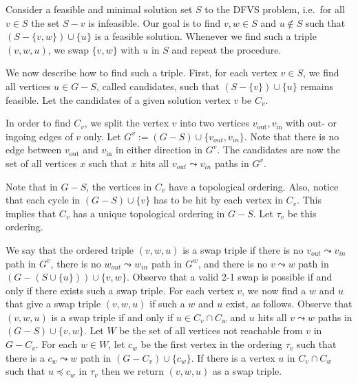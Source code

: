 Consider a feasible and minimal solution set $S$ to the DFVS problem, i.e.~for all $v \in S$ the set $S - v$ is infeasible. 
Our goal is to find $v,w\in S$ and $u\notin S$ such that $\left(S-\{v,w\}\right)\cup \{u\}$ is a feasible solution.
Whenever we find such a triple $(v,w, u)$, we swap $\{v, w\}$ with $u$ in $S$ and repeat the procedure.

We now describe how to find such a triple.
First, for each vertex $v \in S$, we find all vertices $u \in G-S$, called candidates, such that $\left(S-\{v\}\right)\cup \{u\}$ remains feasible. 
Let the candidates of a given solution vertex $v$ be $C_v$. 

In order to find $C_v$, we split the vertex $v$ into two vertices $v_{\text{out}}, v_{\text{in}}$ with out- or ingoing edges of $v$ only. Let $G^v:= (G-S)\cup \{v_{out}, v_{in}\}$.  Note that there is no edge between $v_{\text{out}}$ and $v_{\text{in}}$ in either direction in $G^v$. The candidates are now the set of all vertices $x$ such that $x$ hits all $v_{out}\leadsto v_{in}$ paths in $G^v$.

Note that in $G-S$, the vertices in $C_v$  have a topological ordering.
Also, notice that each cycle in $(G-S)\cup \{v\}$ has to be hit by each vertex in $C_v$.
This implies that $C_v$ has a unique topological ordering in $G-S$.
Let $\tau_v$ be this ordering.

We say that the ordered triple $(v,w,u)$ is a swap triple if there is no $v_{out}\leadsto v_{in}$ path in $G^v$, there is no $w_{out}\leadsto w_{in}$ path in $G^w$, and there is no $v\leadsto w$ path in $(G-\left(S\cup\{u\}\right))\cup \{v,w\}$.
Observe that a valid 2-1 swap is possible if and only if there exists such a swap triple.
For each vertex $v$, we now find a $w$ and $u$ that give a swap triple $(v,w,u)$ if such a $w$ and $u$ exist, as follows.
Observe that $(v,w,u)$ is a swap triple if and only if $u\in C_v\cap C_w$ and $u$ hits all $v\leadsto w$ paths in $(G-S)\cup \{v,w\}$.
Let $W$ be the set of all vertices not reachable from $v$ in $G-C_v$.
For each $w\in W$, let $c_w$ be the first vertex in the ordering $\tau_v$ such that there is a $c_w\leadsto w$ path in $(G-C_v)\cup \{c_w\}$.
If there is a vertex $u$ in $C_v\cap C_w$ such that $u\preceq c_w$ in $\tau_v$ then we return $(v,w,u)$ as a swap triple.

